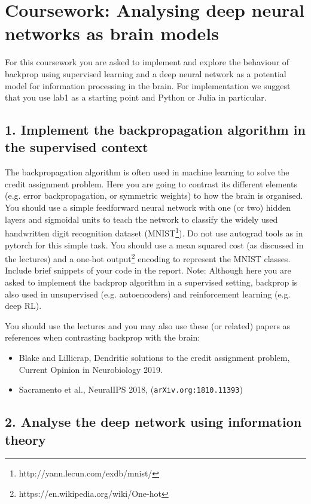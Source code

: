 \documentclass[12pt]{article}
\begin{document}
\section*{Coursework: Analysing deep neural networks as brain models}


For this coursework you are asked to implement and explore the
behaviour of backprop using supervised learning and a deep neural
network as a potential model for information processing in the
brain. For implementation we suggest that you use lab1 as a starting
point and Python or Julia in particular.

\subsection*{1. Implement the backpropagation algorithm in the supervised context}

The backpropagation algorithm is often used in machine learning to
solve the credit assignment problem. Here you are going to contrast
its different elements (e.g. error backpropagation, or symmetric
weights) to how the brain is organised. You should use a simple
feedforward neural network with one (or two) hidden layers and
sigmoidal units to teach the network to classify the widely used
handwritten digit recognition dataset
(MNIST\footnote{http://yann.lecun.com/exdb/mnist/}). Do not use
autograd tools as in pytorch for this simple task. You should use a
mean squared cost (as discussed in the lectures) and a one-hot
output\footnote{https://en.wikipedia.org/wiki/One-hot} encoding to
represent the MNIST classes.  Include brief snippets of your code in
the report. Note: Although here you are asked to implement the
backprop algorithm in a supervised setting, backprop is also used in
unsupervised (e.g. autoencoders) and reinforcement learning (e.g. deep
RL).

You should use the lectures and you may also use these (or related)
papers as references when contrasting backprop with the brain:

\begin{itemize}
\item Blake and Lillicrap, Dendritic solutions to the credit
  assignment problem, Current Opinion in Neurobiology 2019.
\item Sacramento et al., NeuralIPS 2018,
  (\texttt{arXiv.org:1810.11393})
\end{itemize}
 
\subsection*{2. Analyse the deep network using information theory}
\end{document}
